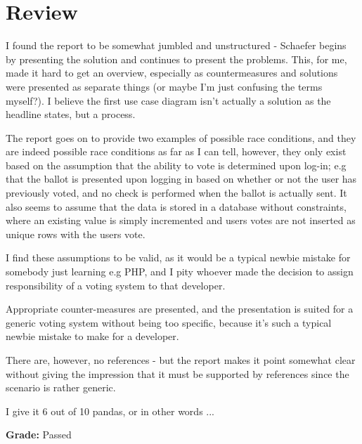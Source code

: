 \section{Review}
I found the report to be somewhat jumbled and unstructured - Schaefer begins by presenting the solution and continues to present the problems. This, for me, made it hard to get an overview, especially as countermeasures and solutions were presented as separate things (or maybe I'm just confusing the terms myself?). I believe the first use case diagram isn't actually a solution as the headline states, but a process.

The report goes on to provide two examples of possible race conditions, and they are indeed possible race conditions as far as I can tell, however, they only exist based on the assumption that the ability to vote is determined upon log-in; e.g that the ballot is presented upon logging in based on whether or not the user has previously voted, and no check is performed when the ballot is actually sent. It also seems to assume that the data is stored in a database without constraints, where an existing value is simply incremented and users votes are not inserted as unique rows with the users vote. 

I find these assumptions to be valid, as it would be a typical newbie mistake for somebody just learning e.g PHP, and I pity whoever made the decision to assign responsibility of a voting system to that developer. 

Appropriate counter-measures are presented, and the presentation is suited for a generic voting system without being too specific, because it's such a typical newbie mistake to make for a developer.

There are, however, no references - but the report makes it point somewhat clear without giving the impression that it must be supported by references since the scenario is rather generic.

I give it 6 out of 10 pandas, or in other words ...

\huge{\textbf{Grade:} Passed}
